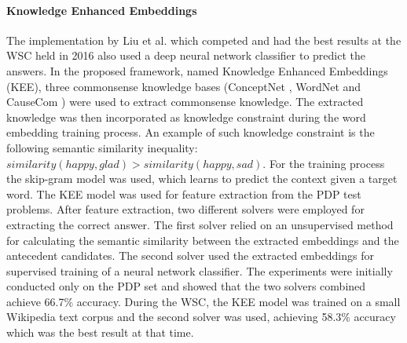 \paragraph{Knowledge Enhanced Embeddings}
The implementation by Liu et al. \cite{DBLP:journals/corr/LiuJLZWH16} which competed and had the best results at the WSC held in 2016 also used a deep neural network classifier to predict the answers. In the proposed framework, named Knowledge Enhanced Embeddings (KEE), three commonsense knowledge bases (ConceptNet \cite{articleC}, WordNet \cite{DBLP:journals/cacm/Miller95} and CauseCom \cite{DBLP:journals/corr/Liu0LWH16}) were used to extract commonsense knowledge. The extracted knowledge was then incorporated as knowledge constraint during the word embedding training process. An example of such knowledge constraint is the following semantic similarity inequality: $similarity(happy,glad) > similarity(happy,sad)$. For the training process the skip-gram model \cite{DBLP:journals/corr/abs-1301-3781} was used, which learns to predict the context given a target word. The KEE model was used for feature extraction from the PDP test problems. After feature extraction, two different solvers were employed for extracting the correct answer. The first solver relied on an unsupervised method for calculating the semantic similarity between the extracted embeddings and the antecedent candidates. The second solver used the extracted embeddings for supervised training of a neural network classifier. The experiments were initially conducted only on the PDP set and showed that the two solvers combined achieve 66.7\% accuracy. During the WSC, the KEE model was trained on a small Wikipedia text corpus and the second solver was used, achieving 58.3\% accuracy which was the best result at that time. 

